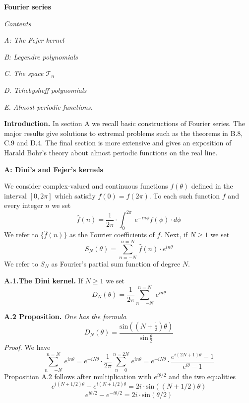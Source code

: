 \documentclass{amsart}
\begin{document}
\centerline{\bf \large{Fourier series}}
\bigskip


\noindent

\centerline{\emph{Contents}}
\bigskip


\noindent
\emph{A: The Fejer kernel}

\bigskip


\noindent
\emph{B: Legendre polynomials}



\bigskip


\noindent
\emph{C. The space $\mathcal T_n$}


\bigskip


\noindent
\emph{D. Tchebysheff  polynomials}


\bigskip


\noindent
\emph{E. Almost periodic functions.}



\bigskip

\noindent
{\bf{Introduction.}}
In section A we recall basic constructions of Fourier series.
The major
results give solutions to extremal problems
such as the theorems in
B.8, C.9  and D.4. The final section is more extensive and
gives an exposition of Harald Bohr's theory about almost periodic functions on 
the real line.


\bigskip

\centerline
{\bf{A: Dini's and Fejer's kernels}}
\bigskip

\noindent
We consider complex-valued 
and continuous functions $f(\theta)$ defined in the interval
$[0,2\pi]$ which satisfiy
$f(0)=f(2\pi)$. To each such function $f$ and every integer $n$ we set
\[ 
\widehat f(n)=\frac{1}{2\pi}\cdot \int_0^{2\pi}\
e^{-in\phi}f(\phi)\cdot d\phi
\]
We refer to $\{\widehat f(n)\}$ as the Fourier coefficients of $f$.
Next, if $N\geq 1$ we set
\[
S_N(\theta)=\sum_{n=-N}^{n=N}\, \hat f(n)\cdot e^{in\theta}
\]
We refer to $S_N$ as Fourier's partial sum function of degree $N$.
\medskip

\noindent
{\bf A.1.The Dini kernel.}
If $N\geq 1$ we set
\[ 
D_N(\theta)=
\frac{1}{2\pi}\sum_{n=-N}^{n=N}\, e^{in\theta}
\]


\noindent
{\bf A.2 Proposition.} \emph{One has the formula}
\[
D_N(\theta)=\frac{\text{sin}((N+\frac{1}{2})\theta)}{\text{sin}\,\frac{\theta}{2}}
\]
\medskip
\noindent
\emph{Proof.}
We have
\[
\sum_{n=-N}^{n=N}\, e^{in\theta}
=e^{-iN\theta}\cdot
\frac{1}{2\pi}\sum_{n=0}^{n=2N}\, e^{in\theta}
=e^{-iN\theta}\cdot
\frac{
e^{i(2N+1)\theta}-1}{e^{i\theta}-1}
\]
Proposition A.2 follows 
after multiplication with
$e^{i\theta/2}$
and  the two equalities
\[
e^{i(N+1/2)\theta}-e^{i(N+1/2)\theta}=2i\cdot\text{sin}((N+1/2)\theta)
\]
\[
e^{i \theta/2}-e^{-i\theta/2}=2i\cdot\text{sin}(\theta/2)
\]
\end{document}
